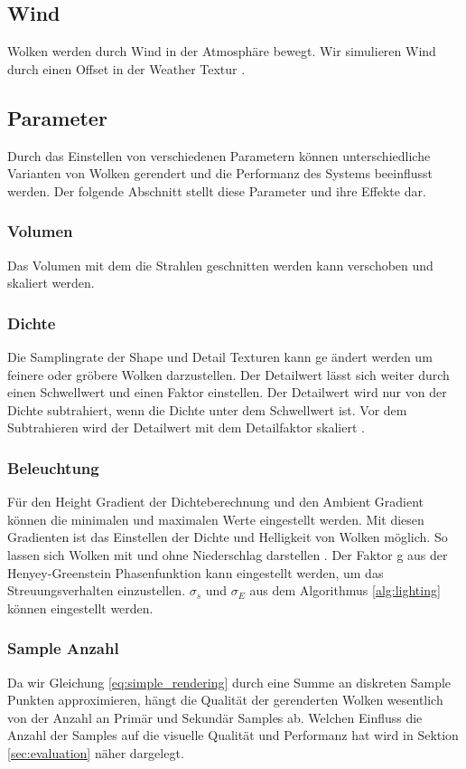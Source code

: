 \subsection{Wind}
Wolken werden durch Wind in der Atmosphäre bewegt. Wir simulieren Wind durch einen Offset in der Weather Textur \cite{Högfeldt16}.

\subsection{Parameter}
Durch das Einstellen von verschiedenen Parametern können unterschiedliche Varianten von Wolken gerendert und die Performanz des Systems beeinflusst werden. Der folgende Abschnitt stellt diese Parameter und ihre Effekte dar.

\subsubsection{Volumen}
Das Volumen mit dem die Strahlen geschnitten werden kann verschoben und skaliert werden.

\subsubsection{Dichte}
Die Samplingrate der Shape und Detail Texturen kann ge ändert werden um feinere oder gröbere Wolken darzustellen. Der Detailwert lässt sich weiter durch einen Schwellwert und einen Faktor einstellen. Der Detailwert wird nur von der Dichte subtrahiert, wenn die Dichte unter dem Schwellwert ist. Vor dem Subtrahieren wird der Detailwert mit dem Detailfaktor skaliert \cite{Högfeldt16}.

\subsubsection{Beleuchtung}
Für den Height Gradient der Dichteberechnung und den Ambient Gradient können die minimalen und maximalen Werte eingestellt werden. Mit diesen Gradienten ist das Einstellen der Dichte und Helligkeit von Wolken möglich. So lassen sich Wolken mit und ohne Niederschlag darstellen \cite{Högfeldt16}. Der Faktor g aus der Henyey-Greenstein Phasenfunktion kann eingestellt werden, um das Streuungsverhalten einzustellen. $ \sigma_s $ und $ \sigma_E $ aus dem Algorithmus \ref{alg:lighting} können eingestellt werden.

\subsubsection{Sample Anzahl}
Da wir Gleichung \ref{eq:simple_rendering} durch eine Summe an diskreten Sample Punkten approximieren, hängt die Qualität der gerenderten Wolken wesentlich von der Anzahl an Primär und Sekundär Samples ab. Welchen Einfluss die Anzahl der Samples auf die visuelle Qualität und Performanz hat wird in Sektion \ref{sec:evaluation} näher dargelegt.

